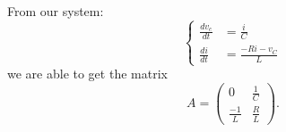 \documentclass[preview]{standalone}
\begin{document}
\begin{center}
\raggedright
    From our system: 
    \[
    \left\{
    \begin{aligned}
        \frac{dv_c}{dt} &= \frac{i}{C} \\
        \frac{di}{dt} &= \frac{-Ri - v_C}{L}
    \end{aligned}
    \right.
    \] 
    we are able to get the matrix 
    \[
    A = \begin{pmatrix}
        0 & \frac{1}{C} \\
        \frac{-1}{L} & \frac{R}{L}
    \end{pmatrix}.
    \]
\end{center}
\end{document}
